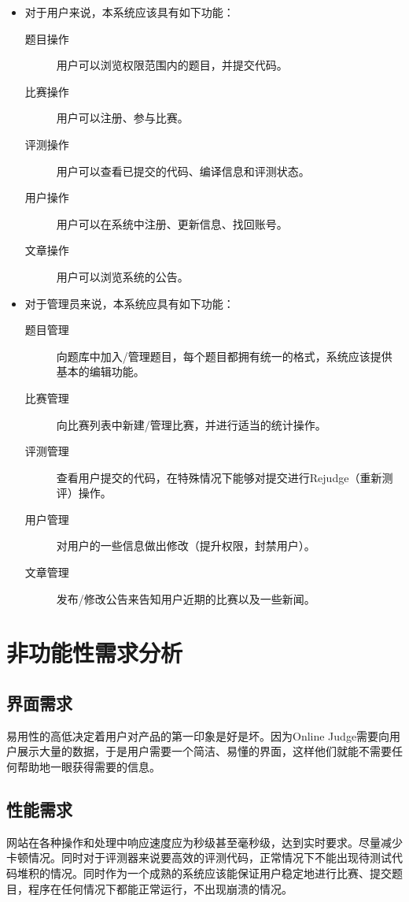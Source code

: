 \begin{itemize}
\item 对于用户来说，本系统应该具有如下功能：
\begin{description}
	\item[题目操作] 用户可以浏览权限范围内的题目，并提交代码。
	\item[比赛操作] 用户可以注册、参与比赛。
	\item[评测操作] 用户可以查看已提交的代码、编译信息和评测状态。
	\item[用户操作] 用户可以在系统中注册、更新信息、找回账号。
	\item[文章操作] 用户可以浏览系统的公告。
\end{description}
\item 对于管理员来说，本系统应具有如下功能：
\begin{description}
	\item[题目管理] 向题库中加入/管理题目，每个题目都拥有统一的格式，系统应该提供基本的编辑功能。
	\item[比赛管理] 向比赛列表中新建/管理比赛，并进行适当的统计操作。
	\item[评测管理] 查看用户提交的代码，在特殊情况下能够对提交进行Rejudge（重新测评）操作。
	\item[用户管理] 对用户的一些信息做出修改（提升权限，封禁用户）。
	\item[文章管理] 发布/修改公告来告知用户近期的比赛以及一些新闻。
\end{description}
\end{itemize}

\section{非功能性需求分析}
\subsection{界面需求}
易用性的高低决定着用户对产品的第一印象是好是坏。因为Online Judge需要向用户展示大量的数据，于是用户需要一个简洁、易懂的界面，这样他们就能不需要任何帮助地一眼获得需要的信息。

\subsection{性能需求}
网站在各种操作和处理中响应速度应为秒级甚至毫秒级，达到实时要求。尽量减少卡顿情况。同时对于评测器来说要高效的评测代码，正常情况下不能出现待测试代码堆积的情况。同时作为一个成熟的系统应该能保证用户稳定地进行比赛、提交题目，程序在任何情况下都能正常运行，不出现崩溃的情况。

